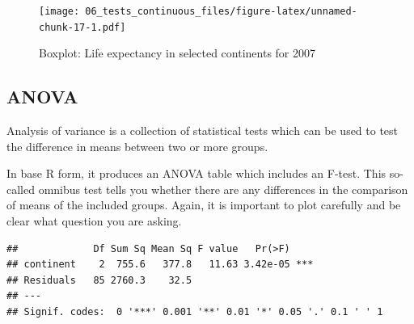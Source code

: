 \documentclass[12pt,]{krantz}
\makeatletter
\newenvironment{Shaded}{\begin{snugshade}}{\end{snugshade}}
\newcommand{\DataTypeTok}[1]{\textcolor[rgb]{0.13,0.29,0.53}{#1}}
\newcommand{\DecValTok}[1]{\textcolor[rgb]{0.00,0.00,0.81}{#1}}
\newcommand{\KeywordTok}[1]{\textcolor[rgb]{0.13,0.29,0.53}{\textbf{#1}}}
\newcommand{\NormalTok}[1]{#1}
\newcommand{\OperatorTok}[1]{\textcolor[rgb]{0.81,0.36,0.00}{\textbf{#1}}}
\newcommand{\StringTok}[1]{\textcolor[rgb]{0.31,0.60,0.02}{#1}}
\newenvironment{kframe}{%
\medskip{}
\setlength{\fboxsep}{.8em}
 \def\at@end@of@kframe{}%
 \ifinner\ifhmode%
  \def\at@end@of@kframe{\end{minipage}}%
  \begin{minipage}{\columnwidth}%
 \fi\fi%
 \def\FrameCommand##1{\hskip\@totalleftmargin \hskip-\fboxsep
 \colorbox{shadecolor}{##1}\hskip-\fboxsep
     \hskip-\linewidth \hskip-\@totalleftmargin \hskip\columnwidth}%
 \MakeFramed {\advance\hsize-\width
   \@totalleftmargin\z@ \linewidth\hsize
   \@setminipage}}%
 {\par\unskip\endMakeFramed%
 \at@end@of@kframe}
\renewenvironment{Shaded}{\begin{kframe}}{\end{kframe}}
\theoremstyle{definition}
\theoremstyle{definition}
\theoremstyle{definition}
\theoremstyle{remark}
\makeatother
\begin{document}
\begin{figure}
\centering
\texttt{[image: 06\_tests\_continuous\_files/figure-latex/unnamed-chunk-17-1.pdf]}
\caption{\label{fig:unnamed-chunk-17}Boxplot: Life expectancy in selected
continents for 2007}
\end{figure}

 

\hypertarget{anova}{%
\subsection{ANOVA}\label{anova}}


Analysis of variance is a collection of statistical tests which can be
used to test the difference in means between two or more groups.

In base R form, it produces an ANOVA table which includes an F-test.
This so-called omnibus test tells you whether there are any differences
in the comparison of means of the included groups. Again, it is
important to plot carefully and be clear what question you are asking.

\begin{Shaded}
\end{Shaded}

\begin{verbatim}
##             Df Sum Sq Mean Sq F value   Pr(>F)    
## continent    2  755.6   377.8   11.63 3.42e-05 ***
## Residuals   85 2760.3    32.5                     
## ---
## Signif. codes:  0 '***' 0.001 '**' 0.01 '*' 0.05 '.' 0.1 ' ' 1
\end{verbatim}
\end{document}
